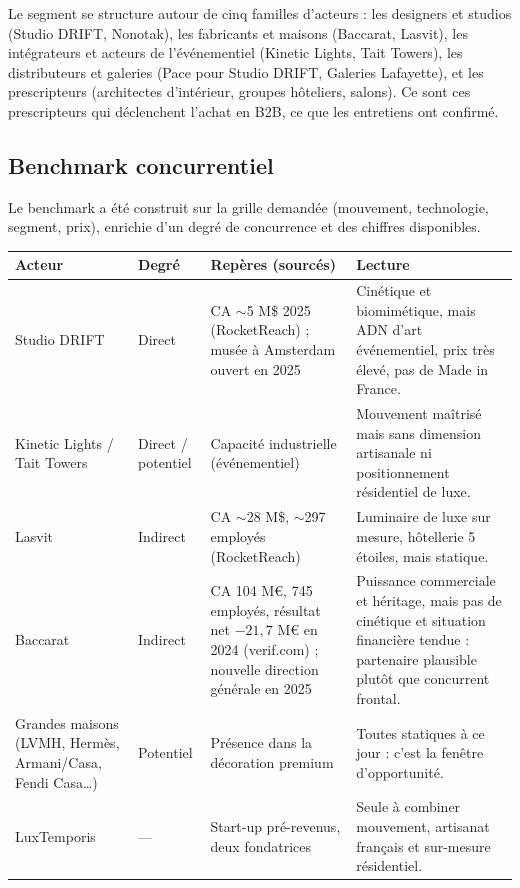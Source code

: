 \documentclass[11pt,a4paper]{article}
\begin{document}
Le segment se structure autour de cinq familles d'acteurs : les designers et studios (Studio DRIFT, Nonotak), les fabricants et maisons (Baccarat, Lasvit), les intégrateurs et acteurs de l'événementiel (Kinetic Lights, Tait Towers), les distributeurs et galeries (Pace pour Studio DRIFT, Galeries Lafayette), et les prescripteurs (architectes d'intérieur, groupes hôteliers, salons). Ce sont ces prescripteurs qui déclenchent l'achat en B2B, ce que les entretiens ont confirmé.

\subsection{Benchmark concurrentiel}

Le benchmark a été construit sur la grille demandée (mouvement, technologie, segment, prix), enrichie d'un degré de concurrence et des chiffres disponibles.

\vspace{0.4em}
\begin{center}
\begin{tabularx}{\linewidth}{L{2.7cm} L{2.0cm} L{3.3cm} X}
\toprule
\textbf{Acteur} & \textbf{Degré} & \textbf{Repères (sourcés)} & \textbf{Lecture} \\
\midrule
Studio DRIFT & Direct &
  CA $\sim$5 M\$ 2025 (RocketReach) ; musée à Amsterdam ouvert en 2025 &
  Cinétique et biomimétique, mais ADN d'art événementiel, prix très élevé, pas de Made in France. \\
\addlinespace
Kinetic Lights / Tait Towers & Direct / potentiel &
  Capacité industrielle (événementiel) &
  Mouvement maîtrisé mais sans dimension artisanale ni positionnement résidentiel de luxe. \\
\addlinespace
Lasvit & Indirect &
  CA $\sim$28 M\$, $\sim$297 employés (RocketReach) &
  Luminaire de luxe sur mesure, hôtellerie 5 étoiles, mais statique. \\
\addlinespace
Baccarat & Indirect &
  CA 104 M€, 745 employés, résultat net $-21{,}7$ M€ en 2024 (verif.com) ; nouvelle direction générale en 2025 &
  Puissance commerciale et héritage, mais pas de cinétique et situation financière tendue : partenaire plausible plutôt que concurrent frontal. \\
\addlinespace
Grandes maisons (LVMH, Hermès, Armani/Casa, Fendi Casa\ldots) & Potentiel &
  Présence dans la décoration premium &
  Toutes statiques à ce jour : c'est la fenêtre d'opportunité. \\
\addlinespace
LuxTemporis & — &
  Start-up pré-revenus, deux fondatrices &
  Seule à combiner mouvement, artisanat français et sur-mesure résidentiel. \\
\bottomrule
\end{tabularx}
\end{center}
\end{document}
